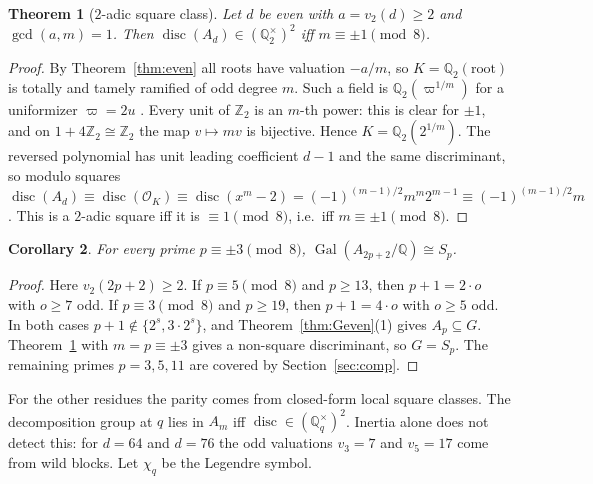 \documentclass[11pt]{amsart}
\newtheorem{theorem}{Theorem}[section]\newtheorem{proposition}[theorem]{Proposition}\newtheorem{lemma}[theorem]{Lemma}
\newtheorem{corollary}[theorem]{Corollary}\newtheorem{conjecture}[theorem]{Conjecture}
\theoremstyle{definition}\newtheorem{definition}[theorem]{Definition}\newtheorem{example}[theorem]{Example}
\theoremstyle{remark}\newtheorem{remark}[theorem]{Remark}
\newcommand{\Q}{\mathbb Q}\newcommand{\Z}{\mathbb Z}\newcommand{\F}{\mathbb F}
\newcommand{\Gal}{\operatorname{Gal}}\newcommand{\disc}{\operatorname{disc}}\newcommand{\Res}{\operatorname{Res}}
\begin{document}
\begin{theorem}[$2$-adic square class]\label{thm:T2}
Let $d$ be even with $a=v_2(d)\ge2$ and $\gcd(a,m)=1$. Then $\disc(A_d)\in(\Q_2^\times)^2$ iff $m\equiv\pm1\pmod8$.
\end{theorem}
\begin{proof}
By Theorem~\ref{thm:even} all roots have valuation $-a/m$, so $K=\Q_2(\text{root})$ is totally and tamely ramified of odd degree $m$. Such a field
is $\Q_2(\varpi^{1/m})$ for a uniformizer $\varpi=2u$ \cite[Ch.~IV]{Serre}. Every unit of $\Z_2$ is an $m$-th power: this is clear for $\pm1$, and on
$1+4\Z_2\cong\Z_2$ the map $v\mapsto mv$ is bijective. Hence $K=\Q_2(2^{1/m})$. The reversed polynomial has unit leading coefficient $d-1$ and the
same discriminant, so modulo squares $\disc(A_d)\equiv\disc(\mathcal O_K)\equiv\disc(x^m-2)=(-1)^{(m-1)/2}m^m2^{m-1}\equiv(-1)^{(m-1)/2}m$. This is
a $2$-adic square iff it is $\equiv1\pmod8$, i.e.\ iff $m\equiv\pm1\pmod8$.
\end{proof}

\begin{corollary}\label{cor:Sp}
For every prime $p\equiv\pm3\pmod8$, $\Gal(A_{2p+2}/\Q)\cong S_p$.
\end{corollary}
\begin{proof}
Here $v_2(2p+2)\ge2$. If $p\equiv5\pmod8$ and $p\ge13$, then $p+1=2\cdot o$ with $o\ge7$ odd. If $p\equiv3\pmod8$ and $p\ge19$, then
$p+1=4\cdot o$ with $o\ge5$ odd. In both cases $p+1\notin\{2^s,3\cdot2^s\}$, and Theorem~\ref{thm:Geven}(1) gives $A_p\subseteq G$.
Theorem~\ref{thm:T2} with $m=p\equiv\pm3$ gives a non-square discriminant, so $G=S_p$. The remaining primes $p=3,5,11$ are covered by
Section~\ref{sec:comp}.
\end{proof}

For the other residues the parity comes from closed-form local square classes. The decomposition group at $q$ lies in $A_m$ iff
$\disc\in(\Q_q^\times)^2$. Inertia alone does not detect this: for $d=64$ and $d=76$ the odd valuations $v_3=7$ and $v_5=17$ come from wild
blocks. Let $\chi_q$ be the Legendre symbol.
\end{document}

